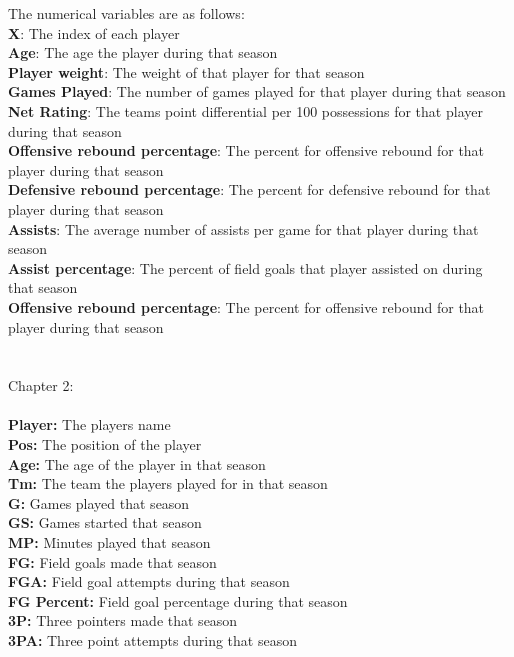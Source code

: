 \documentclass[11pt,letterpaper]{amsart}
\begin{document}
\noindent The numerical variables are as follows:\\
\textbf{X}: The index of each player\\
\textbf{Age}: The age the player during that season\\
\textbf{Player weight}: The weight of that player for that season\\
\textbf{Games Played}: The number of games played for that player during that season\\
\textbf{Net Rating}: The teams point differential per 100 possessions for that player during that season\\
\textbf{Offensive rebound percentage}: The percent for offensive rebound for that player during that season\\
\textbf{Defensive rebound percentage}: The percent for defensive rebound for that player during that season\\
\textbf{Assists}: The average number of assists per game for that player during that season\\
\textbf{Assist percentage}: The percent of field goals that player assisted on during that season\\
\textbf{Offensive rebound percentage}: The percent for offensive rebound for that player during that season\\
\cite{1} \leavevmode \newline\\\\
Chapter 2:\\\\
\textbf{Player:} The players name\\
\textbf{Pos:} The position of the player\\
\textbf{Age:} The age of the player in that season\\
\textbf{Tm:} The team the players played for in that season\\
\textbf{G:} Games played that season\\
\textbf{GS:} Games started that season\\
\textbf{MP:} Minutes played that season\\
\textbf{FG:} Field goals made that season\\
\textbf{FGA:} Field goal attempts during that season\\
\textbf{FG Percent:} Field goal percentage during that season\\
\textbf{3P:} Three pointers made that season\\
\textbf{3PA:} Three point attempts during that season\\
\end{document}
